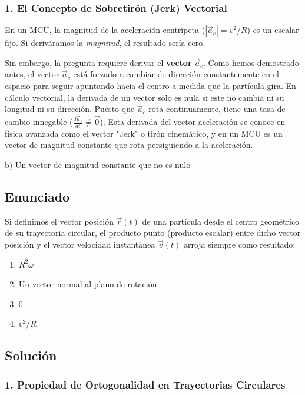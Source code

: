 \documentclass[12pt, a4paper]{article}
\begin{document}
\subsubsection*{1. El Concepto de Sobretirón (Jerk) Vectorial}
En un MCU, la magnitud de la aceleración centrípeta ($|\vec{a}_c| = v^2/R$) es un escalar fijo. Si deriváramos la \textit{magnitud}, el resultado sería cero.

Sin embargo, la pregunta requiere derivar el \textbf{vector} $\vec{a}_c$. 
Como hemos demostrado antes, el vector $\vec{a}_c$ está forzado a cambiar de dirección constantemente en el espacio para seguir apuntando hacia el centro a medida que la partícula gira.
En cálculo vectorial, la derivada de un vector solo es nula si este no cambia ni su longitud ni su dirección. Puesto que $\vec{a}_c$ rota continuamente, tiene una tasa de cambio innegable ($\frac{d\vec{a}_c}{dt} \neq \vec{0}$). Esta derivada del vector aceleración se conoce en física avanzada como el vector "Jerk" o tirón cinemático, y en un MCU es un vector de magnitud constante que rota persiguiendo a la aceleración.

\begin{tcolorbox}[colback=green!5!white, colframe=green!50!black, title=Respuesta Final]
\centering \Large b) Un vector de magnitud constante que no es nulo
\end{tcolorbox}

\newpage

\subsection*{Enunciado}
Si definimos el vector posición $\vec{r}(t)$ de una partícula desde el centro geométrico de su trayectoria circular, el producto punto (producto escalar) entre dicho vector posición y el vector velocidad instantánea $\vec{v}(t)$ arroja siempre como resultado:
\begin{enumerate}[label=\alph*)]
    \item $R^2 \omega$
    \item Un vector normal al plano de rotación
    \item $0$
    \item $v^2 / R$
\end{enumerate}

\subsection*{Solución}

\subsubsection*{1. Propiedad de Ortogonalidad en Trayectorias Circulares}
\end{document}
